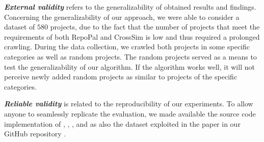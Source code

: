\textit{\textbf{External validity}}  refers to the generalizability of obtained results and findings. Concerning the generalizability of our approach, we were able to consider a dataset of $580$ projects, due to the fact that the number of projects that meet the requirements of both RepoPal and CrossSim is low and thus required a prolonged crawling. During the data collection, we crawled both projects in some specific categories as well as random projects. The random projects served as a means to test the generalizability of our algorithm. If the algorithm works well, it will not perceive newly added random projects as similar to projects of the specific categories.

\textit{\textbf{Reliable validity}}  is related to the reproducibility of our experiments. To allow anyone to seamlessly replicate the evaluation, we made available the source code implementation of \MUDABlue, \CLAN, \RepoPal, and \CrossSim as also the dataset exploited in the paper in our GitHub repository \cite{CROSSSIM-DATA}.